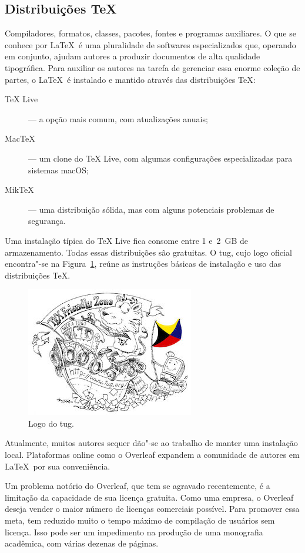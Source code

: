 \subsection{Distribuições \TeX}

Compiladores, formatos, classes, pacotes, fontes e programas auxiliares. O que se conhece por \LaTeX\ é uma pluralidade de softwares especializados que, operando em conjunto, ajudam autores a produzir documentos de alta qualidade tipográfica. Para auxiliar os autores na tarefa de gerenciar essa enorme coleção de partes, o \LaTeX\ é instalado e mantido através das distribuições \TeX:
\begin{description}
	\item[TeX Live] --- a opção mais comum, com atualizações anuais;
	\item[MacTeX] --- um clone do TeX Live, com algumas configurações especializadas para sistemas macOS;
	\item[MikTeX] --- uma distribuição sólida, mas com alguns potenciais problemas de segurança.
\end{description}
Uma instalação típica do TeX Live fica consome entre 1 e~2~GB de armazenamento. Todas essas distribuições são gratuitas. O \ac{tug}, cujo logo oficial encontra"-se na Figura~\ref{fig:tug}, reúne as instruções básicas de instalação e uso das distribuições \TeX.

\begin{figure}
	\caption{Logo do \ac{tug}.}
	\label{fig:tug}
	\includegraphics{./figuras/tug}
\end{figure}

Atualmente, muitos autores sequer dão"-se ao trabalho de manter uma instalação local. Plataformas online como o Overleaf expandem a comunidade de autores em \LaTeX\ por sua conveniência.

Um problema notório do Overleaf, que tem se agravado recentemente, é a limitação da capacidade de sua licença gratuita. Como uma empresa, o Overleaf deseja vender o maior número de licenças comerciais possível. Para promover essa meta, tem reduzido muito o tempo máximo de compilação de usuários sem licença. Isso pode ser um impedimento na produção de uma monografia acadêmica, com várias dezenas de páginas.

